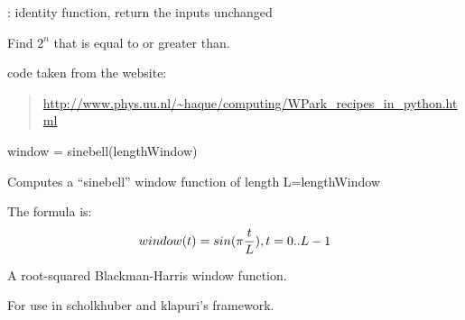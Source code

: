 \documentclass[letterpaper,10pt,english]{sphinxmanual}
\begin{document}

\begin{fulllineitems}
\label{reference/tools:pyfasst.tools.utils.ident}
{\hyperref[reference/tools:pyfasst.tools.utils.ident]{}} : identity function, return the inputs unchanged

\end{fulllineitems}


\begin{fulllineitems}
\label{reference/tools:pyfasst.tools.utils.nextpow2}
Find $2^n$ that is equal to or greater than.

code taken from the website:
\begin{quote}

\href{http://www.phys.uu.nl/~haque/computing/WPark\_recipes\_in\_python.html}{http://www.phys.uu.nl/\textasciitilde{}haque/computing/WPark\_recipes\_in\_python.html}
\end{quote}

\end{fulllineitems}


\begin{fulllineitems}
\label{reference/tools:pyfasst.tools.utils.sinebell}
window = sinebell(lengthWindow)

Computes a ``sinebell'' window function of length L=lengthWindow

The formula is:
\begin{gather}
\begin{split}window(t) = sin(\pi \frac{t}{L}), t=0..L-1\end{split}\notag
\end{gather}
\end{fulllineitems}


\begin{fulllineitems}
\label{reference/tools:pyfasst.tools.utils.sqrt_blackmanharris}
A root-squared Blackman-Harris window function.

For use in scholkhuber and klapuri's framework.

\end{fulllineitems}
\end{document}
